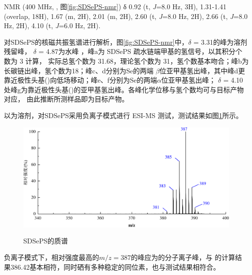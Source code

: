 \documentclass[bachelor,fandolfonts,replaceperiod]{jnuthesis}
\begin{document}
     NMR (400 MHz, , 图\ref{fig:SDSePS-nmr}) δ 0.92 (t, \textit{J}=8.0 Hz, 3H), 1.31-1.41 (overlap, 18H), 
    1.67 (m, 2H), 2.01 (m, 2H), 2.60 (t, \textit{J}=8.0 Hz, 2H), 2.66 (t, \textit{J}=8.0 Hz, 2H),  4.10 (t, \textit{J}=6.0 Hz, 2H).
    
    对SDSePS的核磁共振氢谱进行解析，图\ref{fig:SDSePS-nmr}中，$\delta$ = 3.31的峰为溶剂残留峰，
    $\delta$ = 4.87为水峰\cite{babij2016nmr} ，峰a为 SDSePS 疏水链端甲基的氢信号，以其积分个数为 3 计算，
    实际总氢个数为 31.68，理论氢个数为 31，氢个数基本吻合；峰b为长碳链出峰，氢个数为18；峰c、d分别为Se的两端
    $\beta$位亚甲基氢出峰，其中峰d更靠近极性头基()向低场移动；峰e、f分别为Se的两端$\alpha$位亚甲基氢出峰；
    $\delta$ = 4.10处峰g为靠近极性头基()的亚甲基氢出峰。各峰化学位移与氢个数均可与目标产物对应，
    由此推断所测样品即为目标产物。
    
    以为溶剂，对SDSePS采用负离子模式进行 ESI-MS 测试，测试结果如图\ref{fig:SDSePS-mass}所示。
     \begin{figure}[htbp]
        \centering
        \includegraphics[width=.8\textwidth]{figure/SDSePS-mass.pdf}\\
        \caption{SDSePS的质谱}\label{fig:SDSePS-mass}
    \end{figure}
    
    负离子模式下，相对强度最高的$m/z = 387$的峰应为的分子离子峰，与
    的计算结果386.42基本相符，同时硒有多种稳定的同位素，也与测试结果相符合。
    
\end{document}
